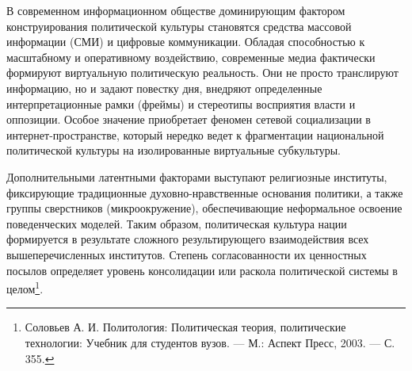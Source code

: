 В современном информационном обществе доминирующим фактором конструирования политической культуры становятся средства массовой информации (СМИ) и цифровые коммуникации. Обладая способностью к масштабному и оперативному воздействию, современные медиа фактически формируют виртуальную политическую реальность. Они не просто транслируют информацию, но и задают повестку дня, внедряют определенные интерпретационные рамки (фреймы) и стереотипы восприятия власти и оппозиции. Особое значение приобретает феномен сетевой социализации в интернет-пространстве, который нередко ведет к фрагментации национальной политической культуры на изолированные виртуальные субкультуры.

Дополнительными латентными факторами выступают религиозные институты, фиксирующие традиционные духовно-нравственные основания политики, а также группы сверстников (микроокружение), обеспечивающие неформальное освоение поведенческих моделей. Таким образом, политическая культура нации формируется в результате сложного результирующего взаимодействия всех вышеперечисленных институтов. Степень согласованности их ценностных посылов определяет уровень консолидации или раскола политической системы в целом\footnote{Соловьев А. И. Политология: Политическая теория, политические технологии: Учебник для студентов вузов. --- М.: Аспект Пресс, 2003. --- С. 355.}.